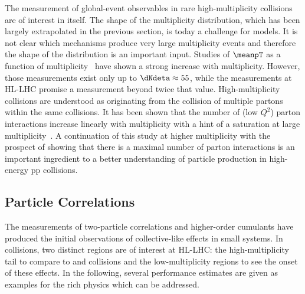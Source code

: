 \documentclass[../report.tex]{subfiles}
\begin{document}
The measurement of global-event observables in rare high-multiplicity \pp collisions are of interest in itself. The shape of the multiplicity distribution, which has been largely extrapolated in the previous section, is today a challenge for models. It is not clear which mechanisms produce very large multiplicity events and therefore the shape of the distribution is an important input. Studies of $\meanpT$ as a function of multiplicity~\cite{Abelev:2013bla} have shown a strong increase with multiplicity. However, those measurements exist only up to $\dNdeta \approx 55$, while the measurements at HL-LHC promise a measurement beyond twice that value. High-multiplicity collisions are understood as originating from the collision of multiple partons within the same \pp collisions. It has been shown that the number of (low $Q^2$) parton interactions increase linearly with multiplicity with a hint of a saturation at large multiplicity~\cite{Abelev:2013sqa}. A continuation of this study at higher multiplicity with the prospect of showing that there is a maximal number of parton interactions is an important ingredient to a better understanding of particle production in high-energy pp collisions.

\subsection{Particle Correlations}
\label{sect:smallsystems_correlations}

The measurements of two-particle correlations and higher-order cumulants have produced the initial observations of collective-like effects in small systems. In \pp collisions, two distinct regions are of interest at HL-LHC: the high-multiplicity tail to compare to \pPb and \PbPb collisions and the low-multiplicity regions to see the onset of these effects. In the following, several performance estimates are given as examples for the rich physics which can be addressed.
\end{document}

